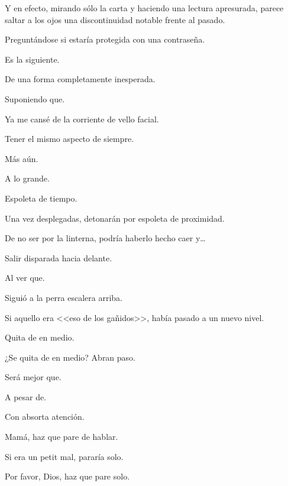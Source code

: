 \sk
Y en efecto, mirando sólo la carta y haciendo una lectura apresurada, parece saltar a los ojos una discontinuidad notable frente al pasado. 

\sk
Preguntándose si estaría protegida con una contraseña.\nb{}

\sk
Es la siguiente. 

\sk
De una forma completamente inesperada. \nb{}

\sk
Suponiendo que. 

\sk
Ya me cansé de la corriente de vello facial. 

\sk
Tener el mismo aspecto de siempre. 

\sk
Más aún. 

\sk
A lo grande. 

\sk
Espoleta de tiempo. 

\sk
Una vez desplegadas, detonarán por espoleta de proximidad. 

\sk
De no ser por la linterna, podría haberlo hecho caer y\ldots{} 

\sk
Salir disparada hacia delante. 

\sk
Al ver que. 

\sk
Siguió a la perra escalera arriba. 

\sk
Si aquello era <<eso de los gañidos>>, había pasado a un nuevo nivel. 

\sk
Quita de en medio. 

\sk
¿Se quita de en medio? Abran paso. 

\sk
Será mejor que. 

\sk
A pesar de. 

\sk
Con absorta atención. 

\sk
Mamá, haz que pare de hablar. 

\sk
Si era un petit mal, pararía solo. 

\sk
Por favor, Dios, haz que pare solo. 

